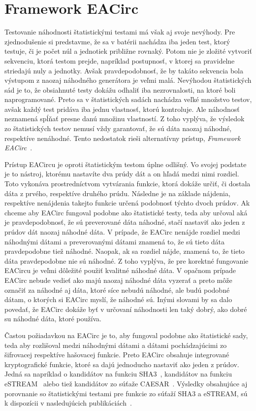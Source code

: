 \chapter{Framework EACirc}
\label{chap:eacirc}

Testovanie náhodnosti štatistickými testami má však aj svoje nevýhody. Pre zjednodušenie si predstavme, že sa v batérii nachádza iba jeden test, ktorý testuje, či je počet núl a jednotiek približne rovnaký. Potom nie je zložité vytvoriť sekvenciu, ktorá testom prejde, napríklad postupnosť, v ktorej sa pravidelne striedajú nuly a jednotky. Avšak pravdepodobnosť, že by takáto sekvencia bola výstupom z naozaj náhodného generátora je veľmi malá. Nevýhodou štatistických sád je to, že obsiahnuté testy dokážu odhaliť iba nezrovnalosti, na ktoré boli naprogramované. Preto sa v štatistických sadách nachádza veľké množstvo testov, avšak každý test pridáva iba jednu vlastnosť, ktorú kontroluje. Ale náhodnosť neznamená spĺňať presne danú množinu vlastností. Z toho vyplýva, že výsledok zo štatistických testov nemusí vždy garantovať, že sú dáta naozaj náhodné, respektíve nenáhodné. Tento nedostatok rieši alternatívny prístup, \textit{Framework EACirc}~\parencite{eacirc-github}. 

Prístup EACircu je oproti štatistickým testom úplne odlišný. Vo svojej podstate je to nástroj, ktorému nastavíte dva prúdy dát a on hľadá medzi nimi rozdiel. Toto vykonáva prostredníctvom vytvárania funkcie, ktorá dokáže určiť, či dostala dáta z prvého, respektíve druhého prúdu. Následne je na základe nájdenia, respektíve nenájdenia takejto funkcie určená podobnosť týchto dvoch prúdov. Ak chceme aby EACirc fungoval podobne ako štatistické testy, teda aby určoval aká je pravdepodobnosť, že sú preverované dáta náhodné, stačí nastaviť ako jeden z prúdov dát naozaj náhodné dáta. V prípade, že EACirc nenájde rozdiel medzi náhodnými dátami a preverovanými dátami znamená to, že sú tieto dáta pravdepodobne tiež náhodné. Naopak, ak sa rozdiel nájde, znamená to, že tieto dáta pravdepodobne nie sú náhodné. Z toho vyplýva, že pre korektné fungovanie EACircu je veľmi dôležité použiť kvalitné náhodné dáta. V opačnom prípade EACirc nebude vedieť ako majú naozaj náhodné dáta vyzerať a preto môže označiť za náhodné aj dáta, ktoré síce nebudú náhodné, ale budú podobné dátam, o ktorých si EACirc myslí, že náhodné sú. Inými slovami by sa dalo povedať, že EACirc dokáže byť v určovaní náhodnosti len taký dobrý, ako dobré su náhodné dáta, ktoré používa.

Častou požiadavkou na EACirc je to, aby fungoval podobne ako štatistické sady, teda aby rozlišoval medzi náhodnými dátami a dátami pochádzajúcimi zo šifrovacej respektíve hašovacej funkcie. Preto EACirc obsahuje integrované kryptografické funkcie, ktoré sa dajú jednoducho nastaviť ako jeden z prúdov. Jedná sa napríklad o kandidátov na funkciu SHA3~\cite{thesis-dubovec}, kandidátov na funkciu eSTREAM~\parencite{thesis-pristak} alebo tiež kandidátov zo súťaže CAESAR~\cite{ukrop-master}. Výsledky obsahujúce aj porovnanie so štatistickými testami pre funkcie zo súťaží SHA3 a eSTREAM, sú k dispozícii v nasledujúcich publikáciách~\parencite{ukrop-bc, svenda2013, svenda2014}.

